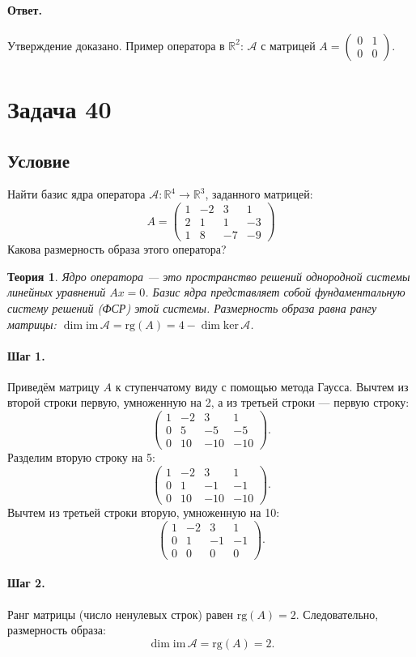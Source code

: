 \documentclass[12pt,a4paper]{article}
\theoremstyle{solution}
\newtheorem*{theory}{Теория}
\newcommand{\task}[1]{\newpage\section*{Задача #1}}
\newcommand{\answer}{\paragraph{Ответ.}}
\newcommand{\step}[1]{\paragraph{Шаг #1.}}
\newcommand{\R}{\mathbb{R}}
\begin{document}
\answer
Утверждение доказано. Пример оператора в $\R^2$: $\mathcal{A}$ с матрицей $A = \begin{pmatrix} 0 & 1 \\ 0 & 0 \end{pmatrix}$.

\task{40}
\subsection*{Условие}
Найти базис ядра оператора $\mathcal{A} : \R^4 \to \R^3$, заданного матрицей:
\[
A = \begin{pmatrix} 1 & -2 & 3 & 1 \\ 2 & 1 & 1 & -3 \\ 1 & 8 & -7 & -9 \end{pmatrix}
\]
Какова размерность образа этого оператора?

\begin{theory}
Ядро оператора — это пространство решений однородной системы линейных уравнений $A x = 0$. Базис ядра представляет собой фундаментальную систему решений (ФСР) этой системы. Размерность образа равна рангу матрицы: $\dim \mathrm{im}\,\mathcal{A} = \mathrm{rg}(A) = 4 - \dim \mathrm{ker}\,\mathcal{A}$.
\end{theory}

\step{1} Приведём матрицу $A$ к ступенчатому виду с помощью метода Гаусса.
Вычтем из второй строки первую, умноженную на 2, а из третьей строки — первую строку:
\[
\begin{pmatrix} 1 & -2 & 3 & 1 \\ 0 & 5 & -5 & -5 \\ 0 & 10 & -10 & -10 \end{pmatrix}.
\]
Разделим вторую строку на 5:
\[
\begin{pmatrix} 1 & -2 & 3 & 1 \\ 0 & 1 & -1 & -1 \\ 0 & 10 & -10 & -10 \end{pmatrix}.
\]
Вычтем из третьей строки вторую, умноженную на 10:
\[
\begin{pmatrix} 1 & -2 & 3 & 1 \\ 0 & 1 & -1 & -1 \\ 0 & 0 & 0 & 0 \end{pmatrix}.
\]

\step{2} Ранг матрицы (число ненулевых строк) равен $\mathrm{rg}(A) = 2$.
Следовательно, размерность образа:
\[
\dim \mathrm{im}\,\mathcal{A} = \mathrm{rg}(A) = 2.
\]
\end{document}

